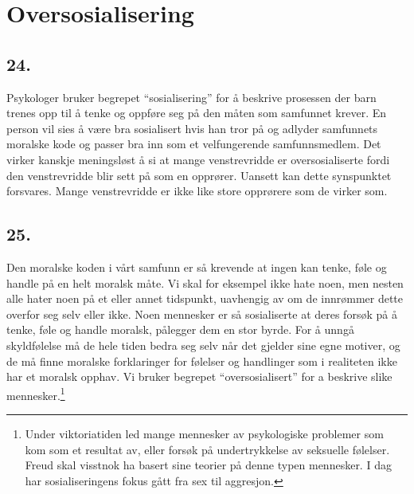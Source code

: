 \documentclass[oneside]{book}
\begin{document}
\chapter{Oversosialisering}
\section*{24.}
Psykologer bruker begrepet ``sosialisering'' for å beskrive prosessen der barn
trenes opp til å tenke og oppføre seg på den måten som samfunnet krever. En
person vil sies å være bra sosialisert hvis han tror på og adlyder samfunnets
moralske kode og passer bra inn som et velfungerende samfunnsmedlem. Det virker
kanskje meningsløst å si at mange venstrevridde er oversosialiserte fordi den
venstrevridde blir sett på som en opprører. Uansett kan dette synspunktet
forsvares. Mange venstrevridde er ikke like store opprørere som de virker som.

\section*{25.}
Den moralske koden i vårt samfunn er så krevende at ingen kan tenke, føle og
handle på en helt moralsk måte. Vi skal for eksempel ikke hate noen, men nesten
alle hater noen på et eller annet tidspunkt, uavhengig av om de innrømmer dette
overfor seg selv eller ikke. Noen mennesker er så sosialiserte at deres forsøk
på å tenke, føle og handle moralsk, pålegger dem en stor byrde. For å unngå
skyldfølelse må de hele tiden bedra seg selv når det gjelder sine egne motiver,
og de må finne moralske forklaringer for følelser og handlinger som i
realiteten ikke har et moralsk opphav. Vi bruker begrepet ``oversosialisert''
for a beskrive slike mennesker.\footnote{Under viktoriatiden led mange
mennesker av psykologiske problemer som kom som et resultat av, eller forsøk på
undertrykkelse av seksuelle følelser. Freud skal visstnok ha basert sine
teorier på denne typen mennesker. I dag har sosialiseringens fokus gått fra sex
til aggresjon.}
\end{document}
